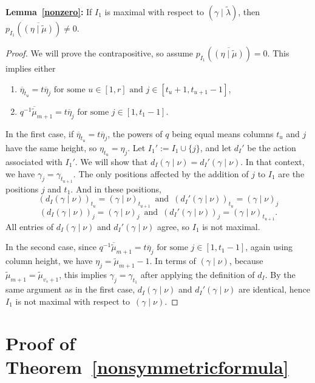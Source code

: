 \documentclass[ALCO]{cedram}
\newcommand{\gammanu}{{(\gamma \mid \nu)}}
\newcommand{\mutilde}{{\widetilde{\mu}}}
\newcommand{\lambdatilde}{{\widetilde{\lambda}}}
\newcommand{\gammalambdatilde}{{(\gamma \mid \lambdatilde)}}
\newcommand{\etamutilde}{{(\eta \mid \widetilde{\mu})}}
\newcommand{\pIoneevaluated}{p_{I_1}\left(\overline{\etamutilde}\right)}
\newcommand{\dI}{d_I}
\begin{document}
\textbf{Lemma~\ref{nonzero}:} If $I_1$ is maximal with respect to $\gammalambdatilde$, then $\pIoneevaluated \neq 0$.

\begin{proof}
We will prove the contrapositive, so assume $p_{I_1}\left( \overline{\etamutilde}\right) = 0$. This implies either \begin{enumerate} \item $\overline{\eta}_{t_u} = t \overline{\eta}_j \text{ for some } u\in [1,r] \text{ and } j\in [t_u+1,t_{u+1}-1]$,  \item $ q^{-1} \overline{\mutilde}_{m+1} = t \overline{\eta}_j \text{ for some } j \in [1,t_1-1]$.
 \end{enumerate}
 In the first case, if $\overline{\eta}_{t_u} = t\overline{\eta}_j$, the powers of $q$ being equal means columns $t_u$ and $j$ have the same height, so $\eta_{t_u} = \eta_j$. Let $I_1' := I_1 \cup \{j\}$, and let $\dI'$ be the action associated with $I_1'$. We will show that $d_I\gammanu = d_I'\gammanu$. In that context, we have $\gamma_j = \gamma_{t_{u+1}}$. The only positions affected by the addition of $j$ to $I_1$ are the positions $j$ and $t_1$. And in these positions,
 \[ (\dI \gammanu)_{t_u} = \gammanu_{t_{u+1}} \, \text{ and }\,  (\dI' \gammanu)_{t_u} = \gammanu_j\]
 \[ (\dI \gammanu)_{j} = \gammanu_j  \, \text{ and } \, (\dI' \gammanu)_{j} = \gammanu_{t_{u+1}}.\]
 All entries of $d_I\gammanu$ and $d_I'\gammanu$ agree, so $I_1$ is not maximal.
 
 In the second case, since $ q^{-1} \overline{\mutilde}_{m+1} = t \overline{\eta}_j \text{ for some } j \in [1,t_1-1]$, again using column height, we have $\eta_j = \mutilde_{m+1}-1$. In terms of $\gammanu$, because $\mutilde_{m+1} = \mutilde_{v_s+1}$, this implies $\gamma_j = \gamma_{t_1}$ after applying the definition of $\dI$. By the same argument as in the first case, $d_I\gammanu$ and $d_I'\gammanu$ are identical, hence $I_1$ is not maximal with respect to~$\gammanu$.
 \end{proof}

\section{Proof of Theorem~\ref{nonsymmetricformula}}
\end{document}
